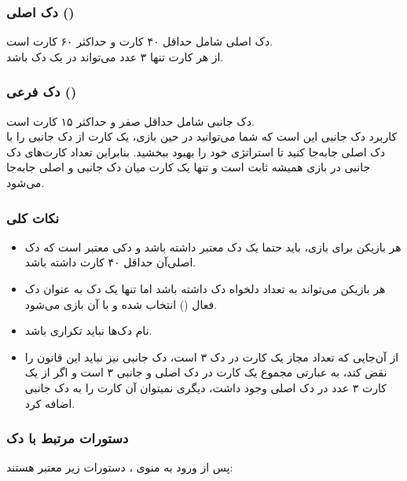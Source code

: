 \documentclass[]{article}
\begin{document}
\subsubsection*{{\titr دک اصلی ()}}
دک اصلی شامل حداقل ۴۰ کارت و حداکثر ۶۰ کارت است. 
\\
از هر کارت تنها ۳ عدد می‌تواند در یک دک باشد. 


\subsubsection*{{\titr دک فرعی ()}}
دک جانبی شامل حداقل صفر و حداکثر ۱۵ کارت است.
\\
کاربرد دک جانبی این است که شما می‌توانید در حین بازی، یک کارت از دک جانبی را 
با دک اصلی جا‌به‌جا کنید تا استراتژی خود را بهبود ببخشید. بنابراین تعداد 
کارت‌های دک جانبی در بازی همیشه ثابت است و تنها یک کارت میان دک جانبی و اصلی 
جا‌به‌جا می‌شود.

\subsubsection*{{\titr نکات کلی}}
\begin{itemize}
	\item
	هر بازیکن برای بازی‌، باید حتما یک دک معتبر داشته باشد و دکی معتبر است 
	که دک اصلی‌آن حداقل ۴۰ کارت داشته باشد.
	\item
	هر بازیکن می‌تواند به تعداد دلخواه دک داشته باشد اما تنها یک دک به عنوان 
	دک فعال () انتخاب شده و با آن بازی می‌شود.
	\item
	نام دک‌ها نباید تکراری باشد.
	\item
	از آن‌جایی که تعداد مجاز یک کارت در دک ۳ است، دک جانبی نیز نباید این 
	قانون را نقض کند، به عبارتی مجموع یک کارت در دک اصلی و جانبی ۳ است و 
	اگر از 
	یک کارت ۳ عدد در دک اصلی وجود داشت، دیگری نمیتوان آن کارت را به دک 
	جانبی 
	اضافه کرد.
\end{itemize}

\subsubsection*{{\titr دستورات مرتبط با دک}}
پس از ورود به منوی ، دستورات زیر معتبر هستند:
\end{document}
